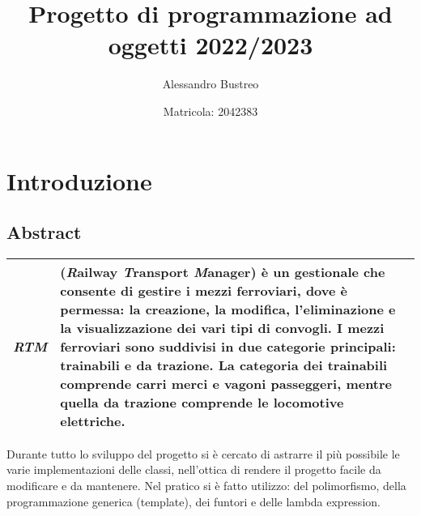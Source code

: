 \documentclass[a4paper,10pt]{article}
\title{Progetto di programmazione ad oggetti 2022/2023}
\author{Alessandro Bustreo \and Matricola: 2042383}
\newcommand{\RTM}{\emph{RTM }}
\begin{document}
  \maketitle
  \tableofcontents
  \newpage
  \section{Introduzione}
    \subsection{Abstract}
      \begin{tabularx}{\textwidth}{lX}
        \toprule
          \textbf{\RTM} &
          (\emph{R}ailway \emph{T}ransport \emph{M}anager) è un gestionale che consente di gestire
          i mezzi ferroviari, dove è permessa: la creazione, la modifica, l'eliminazione e la
          visualizzazione dei vari  tipi di convogli. I mezzi ferroviari sono suddivisi in due
          categorie principali: trainabili e da trazione. La categoria dei trainabili comprende
          carri merci e vagoni passeggeri, mentre quella da trazione comprende le locomotive
          elettriche. \\
        \bottomrule
    \end{tabularx}
    \newline\newline\newline

Durante tutto lo sviluppo del progetto si è cercato di astrarre il più possibile le varie implementazioni delle classi, nell'ottica di rendere il progetto facile da modificare e da mantenere. Nel pratico si è fatto utilizzo: del polimorfismo, della programmazione generica (template), dei funtori e delle lambda expression.
\end{document}

